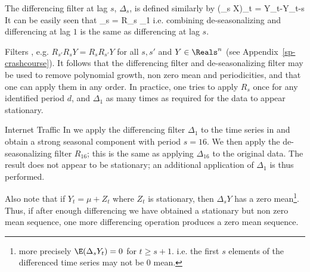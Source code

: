 The differencing filter at lag $s$,
$\Delta_s$, is defined similarly by
 \be
 (\Delta_s X)_t =  Y_{t}-Y_{t-s} \;\;\;\;\;
 \ee
 It can be easily seen that
 \be
 \Delta_s = R_s \Delta_1
 \ee
i.e. combining de-seasonalizing and differencing at
lag $1$ is the same as differencing at lag $s$.

Filters , e.g. $R_{s'} R_{s} Y =R_s R_{s'}Y$ for
all $s, s'$ and $Y \in \Reals^n$ (see
Appendix~\ref{sp-crashcourse}). It follows that the
differencing filter and de-seasonalizing filter may be used to
remove polynomial growth, non zero mean and periodicities, and
that one can apply them in any order. In practice, one tries to
apply $R_s$ once for any identified period $d$, and $\Delta_1$
as many times as required for the data to appear stationary.

\begin{ex}{Internet Traffic} In 
we apply the differencing filter $\Delta_1$ to the
time series in  and obtain a
strong seasonal component with period $s=16$. We then
apply the de-seasonalizing filter $R_{16}$; this is
the same as applying $\Delta_{16}$ to the original
data. The result does not appear to be stationary; an
additional application of $\Delta_1$ is thus
performed.
\end{ex}
\begin{figure}[!htbp]\begin{center}
\end{center}
\end{figure}


Also note that if $Y_t=\mu + Z_t$ where $Z_t$ is
stationary, then $\Delta_s Y$ has a zero
mean\footnote{more precisely $\E(\Delta_s Y_t) = 0$
for $t\geq s+1$. i.e. the first $s$ elements of the
differenced time series may not be 0 mean.}. Thus, if
after enough differencing we have obtained a
stationary but non zero mean sequence, one more
differencing operation produces a zero mean sequence.
